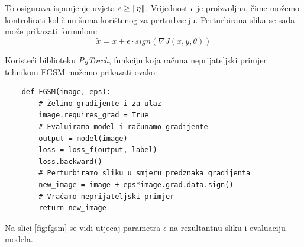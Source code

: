 To osigurava ispunjenje uvjeta $\epsilon \geq \left\|{\eta}\right\|$. Vrijednost $\epsilon$ je proizvoljna, čime možemo kontrolirati količinu šuma korištenog za perturbaciju. Perturbirana slika se sada može prikazati formulom: 
\[\widetilde{x} = x + \epsilon\cdot sign\left(\nabla J(x, y, \theta)\right)\]

Koristeći biblioteku \textit{PyTorch}, funkciju koja računa neprijateljski primjer tehnikom FGSM možemo prikazati ovako:

\begin{verbatim}
    def FGSM(image, eps):
        # Želimo gradijente i za ulaz
        image.requires_grad = True
        # Evaluiramo model i računamo gradijente
        output = model(image)
        loss = loss_f(output, label)
        loss.backward()
        # Perturbiramo sliku u smjeru predznaka gradijenta
        new_image = image + eps*image.grad.data.sign()
        # Vraćamo neprijateljski primjer
        return new_image
\end{verbatim}

Na slici \ref{fig:fgsm} se vidi utjecaj parametra $\epsilon$ na rezultantnu sliku i evaluaciju modela.

